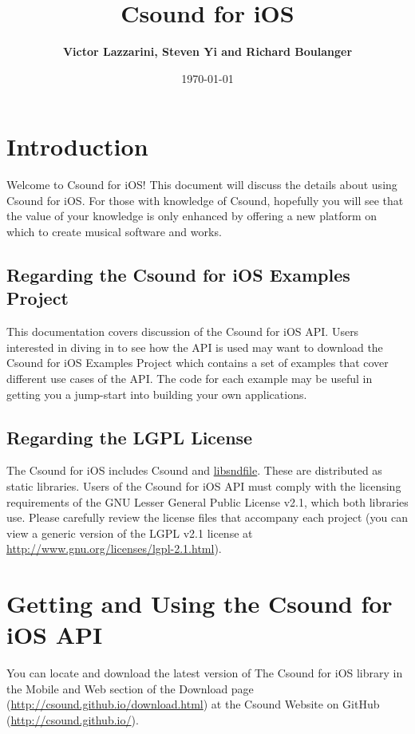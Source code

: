 \documentclass[11pt]{article}
\author{\textbf{Victor Lazzarini, Steven Yi and Richard Boulanger}}
\date{\today}
\title{\textbf{Csound for iOS}}
\begin{document}
\maketitle

\section{Introduction}

Welcome to Csound for iOS! This document will discuss the details about using Csound for iOS. For those with knowledge of Csound, hopefully you will see that the value of your knowledge is only enhanced by offering a new platform on which to create musical software and works.

\subsection{Regarding the Csound for iOS Examples Project}

This documentation covers discussion of the Csound for iOS API.  Users interested in diving in to see how the API is used may want to download the Csound for iOS Examples Project which contains a set of examples that cover different use cases of the API. The code for each example may be useful in getting you a jump-start into building your own applications.

\subsection{Regarding the LGPL License}

The Csound for iOS includes Csound and \href{http://mega-nerd.com/libsndfile/}{libsndfile}. These are distributed as static libraries. Users of the Csound for iOS API must comply with the licensing requirements of the GNU Lesser General Public License v2.1, which both libraries use. Please carefully review the license files that accompany each project (you can view a generic version of the LGPL v2.1 license at \href{http://www.gnu.org/licenses/lgpl-2.1.html}{http://www.gnu.org/licenses/lgpl-2.1.html}).


\section{Getting and Using the Csound for iOS API}

You can locate and download the latest version of The Csound for iOS library in the Mobile and Web section of the Download page (\url{http://csound.github.io/download.html}) at the Csound Website on GitHub (\url{http://csound.github.io/}). 
\end{document}
